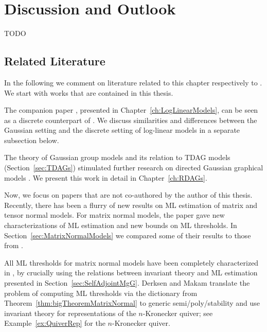 \section{Discussion and Outlook}\label{sec:DiscussionGaussian}

TODO








\subsection*{Related Literature}

In the following we comment on literature related to this chapter respectively to \cite{SiagaPaper}. We start with works that are contained in this thesis.

The companion paper \cite{DiscretePaper}, presented in Chapter~\ref{ch:LogLinearModels}, can be seen as a discrete counterpart of \cite{SiagaPaper}. We discuss similarities and differences between the Gaussian setting and the discrete setting of log-linear models in a separate subsection below.

The theory of Gaussian group models and its relation to TDAG models (Section~\ref{sec:TDAGs}) stimulated further research on directed Gaussian graphical models \cite{RDAG}. We present this work in detail in Chapter~\ref{ch:RDAGs}.

\bigskip

Now, we focus on papers that are not co-authored by the author of this thesis.
Recently, there has been a flurry of new results on ML estimation of matrix and tensor normal models.
For matrix normal models, the paper \cite{DrtonKurikiHoff} gave new characterizations of ML estimation and new bounds on ML thresholds. In Section~\ref{sec:MatrixNormalModels} we compared some of their results to those from \cite{SiagaPaper}.

\medskip

All ML thresholds for matrix normal models have been completely characterized in \cite{DM21MatrixNormal}, by crucially using the relations between invariant theory and ML estimation presented in Section~\ref{sec:SelfAdjointMgG}. Derksen and Makam translate the problem of computing ML thresholds via the dictionary from Theorem~\ref{thm:bigTheoremMatrixNormal} to generic semi/poly/stability and use invariant theory for representations of the $n$-Kronecker quiver; see Example~\ref{ex:QuiverRep} for the $n$-Kronecker quiver.

